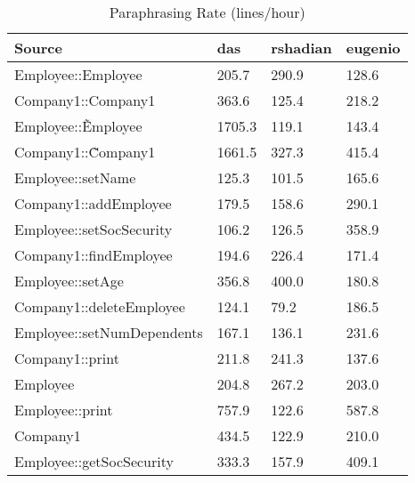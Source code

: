 \begin{table}[hb]
\begin{center}
\begin{tabular}{|l|l|l|l|}
\hline
Source & das & rshadian & eugenio\\
\hline
Employee::Employee & 205.7 & 290.9 & 128.6\\
Company1::Company1 & 363.6 & 125.4 & 218.2\\
Employee::\~Employee & 1705.3 & 119.1 & 143.4\\
Company1::\~Company1 & 1661.5 & 327.3 & 415.4\\
Employee::setName & 125.3 & 101.5 & 165.6\\
Company1::addEmployee & 179.5 & 158.6 & 290.1\\
Employee::setSocSecurity & 106.2 & 126.5 & 358.9\\
Company1::findEmployee & 194.6 & 226.4 & 171.4\\
Employee::setAge & 356.8 & 400.0 & 180.8\\
Company1::deleteEmployee & 124.1 & 79.2 & 186.5\\
Employee::setNumDependents & 167.1 & 136.1 & 231.6\\
Company1::print & 211.8 & 241.3 & 137.6\\
Employee & 204.8 & 267.2 & 203.0\\
Employee::print & 757.9 & 122.6 & 587.8\\
Company1 & 434.5 & 122.9 & 210.0\\
Employee::getSocSecurity & 333.3 & 157.9 & 409.1\\
\hline
\end{tabular}
\end{center}
\caption{Paraphrasing Rate (lines/hour)}
\end{table}

